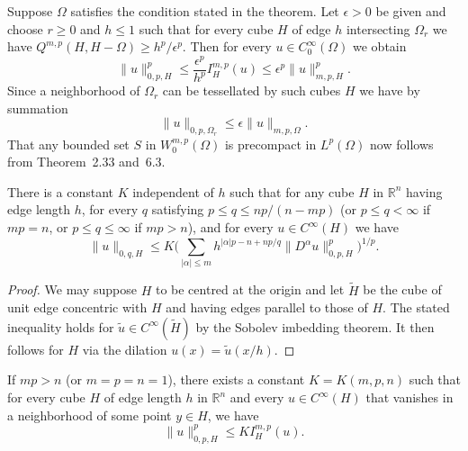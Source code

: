 \begin{para}
  Suppose $\Omega$ satisfies the condition stated in the theorem.
  Let $\epsilon>0$ be given and choose $r\geq 0$ and $h\leq 1$
  such that for every cube $H$ of edge $h$ intersecting $\Omega_r$
  we have $Q^{m,p}(H,H-\Omega)\geq h^p/\epsilon^p$. Then for every
  $u\in C_0^\infty(\Omega)$ we obtain
  \[ \|u\|_{0,p,H}^p \leq \frac{\epsilon^p}{h^p} I_H^{m,p}(u) \leq \epsilon^p \|u\|_{m,p,H}^p. \]
  Since a neighborhood of $\Omega_r$ can be tessellated by such cubes $H$
  we have by summation
  \[ \|u\|_{0,p,\Omega_r} \leq \epsilon \|u\|_{m,p,\Omega}. \]
  That any bounded set $S$ in $W_0^{m,p}(\Omega)$ is precompact in $L^p(\Omega)$
  now follows from Theorem~2.33 and~6.3.
\end{para}


\begin{lemma}
  There is a constant $K$ independent of $h$ such that for any cube $H$
  in $\mathbb{R}^n$ having edge length $h$, for every $q$ satisfying $p\leq q\leq np/(n-mp)$
  (or $p\leq q<\infty$ if $mp=n$, or $p\leq q\leq\infty$ if $mp>n$),
  and for every $u\in C^\infty(H)$ we have
  \[ \|u\|_{0,q,H} \leq K\biggl(\sum_{|\alpha|\leq m} h^{|\alpha|p-n+np/q}
      \|D^\alpha u\|_{0,p,H}^p\biggr)^{1/p}. \]
\end{lemma}


\begin{proof}
  We may suppose $H$ to be centred at the origin and let $\tilde{H}$ be the cube
  of unit edge concentric with $H$ and having edges parallel to those of $H$.
  The stated inequality holds for $\tilde{u}\in C^\infty(\tilde H)$ by the Sobolev
  imbedding theorem. It then follows for $H$ via the dilation $u(x)=\tilde u(x/h)$.
\end{proof}


\begin{lemma}
  If $mp>n$ (or $m=p=n=1$), there exists a constant $K=K(m,p,n)$ such that
  for every cube $H$ of edge length $h$ in $\mathbb{R}^n$ and every $u\in C^\infty(H)$
  that vanishes in a neighborhood of some point $y\in H$, we have
  \[ \|u\|_{0,p,H}^p \leq K I_H^{m,p}(u). \]
\end{lemma}


